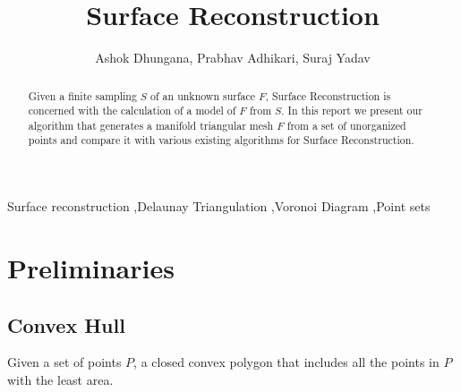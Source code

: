 \documentclass[preprint,5p,times,twocolumn]{elsarticle}
\title{Surface Reconstruction}
\author{Ashok Dhungana, Prabhav Adhikari, Suraj Yadav}
\begin{document}
\begin{frontmatter}




\begin{abstract}
Given a finite sampling $S$ of an unknown surface $F$, Surface Reconstruction is concerned with the calculation of a model of $F$ from $S$. In this report we present our algorithm that generates a manifold triangular mesh $F$ from a set of unorganized points and compare it with various existing algorithms for Surface Reconstruction. 
\end{abstract}

\begin{keyword}
Surface reconstruction \sep Delaunay Triangulation \sep Voronoi Diagram \sep Point sets

\end{keyword}

\end{frontmatter}


\section{Preliminaries}

\subsection{Convex Hull} Given a set of points $P$, a closed convex polygon that includes all the points in $P$ with the least area.
\end{document}
